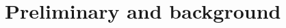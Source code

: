 \documentclass[10pt]{article}
\begin{document}

\section{Preliminary and background}
\end{document}
